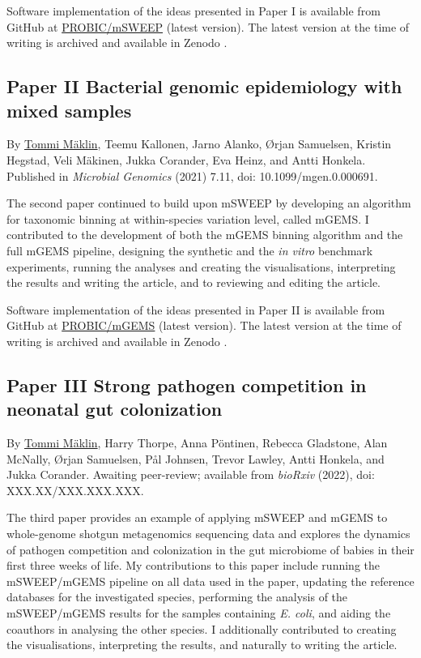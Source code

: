 \documentclass[officiallayout]{tktla}
\begin{document}
Software implementation of the ideas presented in Paper I is
available from GitHub at
\href{https://github.com/PROBIC/mSWEEP}{PROBIC/mSWEEP} (latest
version). The latest version at the time of writing is archived and
available in Zenodo \citep{maklin_mSWEEP}.

\subsection*{Paper II \textemdash Bacterial genomic epidemiology with mixed samples}
By \underline{Tommi Mäklin}, Teemu Kallonen, Jarno Alanko, Ørjan
Samuelsen, Kristin Hegstad, Veli Mäkinen, Jukka Corander, Eva Heinz,
and Antti Honkela. Published in \textit{Microbial Genomics} (2021)
7.11, doi: 10.1099/mgen.0.000691.

The second paper continued to build upon mSWEEP by developing an
algorithm for taxonomic binning at within-species variation level,
called mGEMS. I contributed to the development of both the mGEMS
binning algorithm and the full mGEMS pipeline, designing the synthetic
and the \textit{in vitro} benchmark experiments, running the analyses
and creating the visualisations, interpreting the results and writing
the article, and to reviewing and editing the article.

Software implementation of the ideas presented in Paper II is
available from GitHub at
\href{https://github.com/PROBIC/mGEMS}{PROBIC/mGEMS} (latest version).
The latest version at the time of writing is archived and available in
Zenodo \citep{maklin_mSWEEP}.

\subsection*{Paper III \textemdash Strong pathogen competition in neonatal gut colonization}
By \underline{Tommi Mäklin}, Harry Thorpe, Anna Pöntinen, Rebecca
Gladstone, Alan McNally, Ørjan Samuelsen, Pål Johnsen, Trevor Lawley,
Antti Honkela, and Jukka Corander. Awaiting peer-review; available
from \textit{bioRxiv} (2022), doi: XXX.XX/XXX.XXX.XXX.

The third paper provides an example of applying mSWEEP and mGEMS to
whole-genome shotgun metagenomics sequencing data and explores the
dynamics of pathogen competition and colonization in the gut
microbiome of babies in their first three weeks of life. My
contributions to this paper include running the mSWEEP/mGEMS pipeline
on all data used in the paper, updating the reference databases for
the investigated species, performing the analysis of the mSWEEP/mGEMS
results for the samples containing \textit{E. coli}, and aiding the
coauthors in analysing the other species. I additionally contributed
to creating the visualisations, interpreting the results, and
naturally to writing the article.
\end{document}
